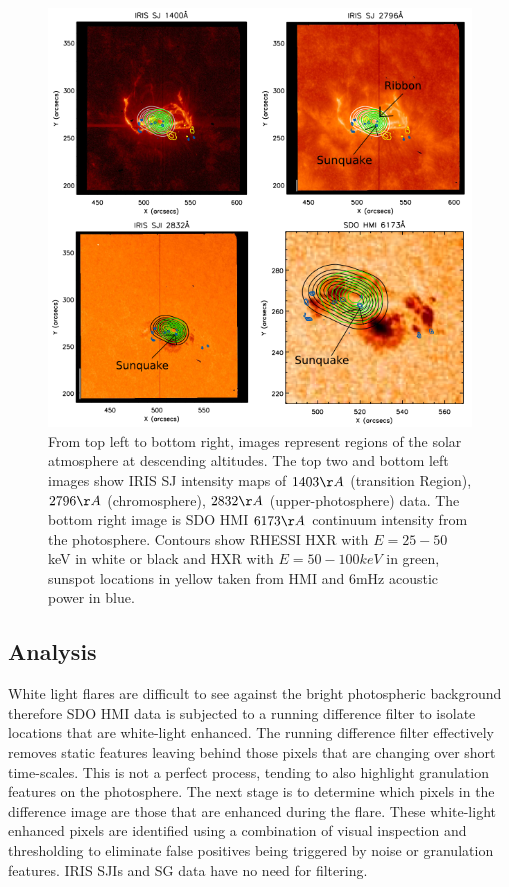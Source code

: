\begin{figure}[H]
  \begin{center}
  \includegraphics[width=1.0\textwidth]{saxcontours-square}
  \end{center}
  \caption{From top left to bottom right, images represent regions of the solar atmosphere at descending altitudes. The top two and bottom left images show IRIS SJ intensity maps of $1403\AA$ (transition Region), $2796\AA$ (chromosphere), $2832\AA$ (upper-photosphere) data. The bottom right image is SDO HMI $6173\AA$ continuum intensity from the photosphere. Contours show RHESSI HXR with $E = 25-50$ keV in white or black and HXR with $E = 50-100 keV$ in green, sunspot locations in yellow taken from HMI and 6mHz acoustic power in blue.}\label{saxcontours-vert}
\end{figure}


\subsection{Analysis}


White light flares are difficult to see against the bright photospheric background therefore SDO HMI data is subjected to a running difference filter to isolate locations that are white-light enhanced. The running difference filter effectively removes static features leaving behind those pixels that are changing over short time-scales. This is not a perfect process, tending to also highlight granulation features on the photosphere. The next stage is to determine which pixels in the difference image are those that are enhanced during the flare.  These white-light enhanced pixels are identified using a combination of visual inspection and thresholding to eliminate false positives being triggered by noise or granulation features. IRIS SJIs and SG data have no need for filtering.


